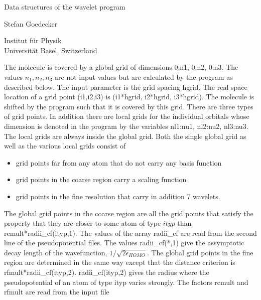 \documentclass[12pt]{article}
\begin{document}
\setlength{\oddsidemargin}{-.3cm}
\setlength{\topmargin}{-2.cm}

\Large \begin{center}
Data structures of the wavelet program
\end{center} 

\large \begin{center}
Stefan Goedecker
\end{center} 
\normalsize \begin{center}
Institut f\"{u}r Physik \\
Universit\"{a}t Basel, Switzerland \\
\end{center} 

\noindent
The molecule is covered by a global grid of dimensions { \color{red} 0:n1, 0:n2, 0:n3}.
The values $n_1,n_2,n_3$ are not input values but are calculated by the program as described below.
The input parameter is the grid spacing { \color{red} hgrid}. 
The real space location of a grid point (i1,i2,i3) is (i1*hgrid, i2*hgrid, i3*hgrid). 
The molecule is shifted by the program such that it is covered by this grid. There 
are three types of grid points. 
In addition there are local grids for the individual orbitals whose dimension 
is denoted in the program by the variables { \color{red} nl1:nu1, nl2:nu2, nl3:nu3}.
The local grids are always inside the global grid. Both the single global grid as 
well as the various local grids consist of 
\begin{itemize}
\item grid points far from any atom that do not carry any basis function
\item grid points in the coarse region carry a scaling function 
\item grid points in the fine resolution that carry in addition 7 wavelets. 
\end{itemize}

The global grid points in the coarse region are all the grid points that satisfy 
the property that they are closer to some atom of type $ityp$ than 
{ \color{red} rcmult*radii\_cf(ityp,1)}.  The values 
of the array radii\_cf are read from the second line of the pseudopotential files.
The values radii\_cf(*,1) give the assymptotic decay length of the wavefunction, 
$1/\sqrt{2 \epsilon_{HOMO}}$.  The global grid points in the fine region are 
determined in the same way except that the distance 
criterion is { \color{red} rfmult*radii\_cf(ityp,2)}. 
radii\_cf(ityp,2) gives the radius where the 
pseudopotential of an atom of type ityp varies  strongly.
The factors rcmult and rfmult are read from the input file
\end{document}
